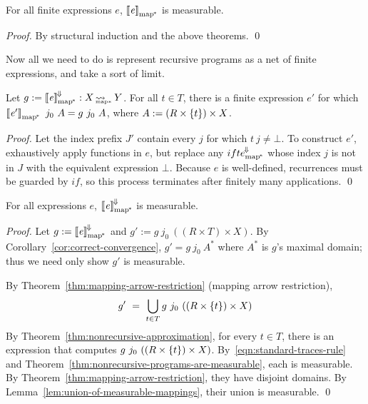 \documentclass{llncs}
\newcommand{\arrow}{\rightsquigarrow}
\newcommand{\conv}{^{\mspace{-2mu}\Downarrow\mspace{-2mu}}}
\newcommand{\meaningofconv}[1]{\left\llbracket{#1}\right\rrbracket\conv}
\newcommand{\arrowconvif}{\ensuremath{ifte\conv}}
\newcommand{\pmap}{_\mathrm{map^{\mspace{-2mu}*}}}
\DeclareMathOperator{\pmapto}{\arrow_{\mspace{-22mu}_{\mathrm{map*}}}}
\newcommand{\convifpmap}{\arrowconvif\pmap}
\begin{document}
\begin{theorem}
\label{thm:nonrecursive-programs-are-measurable}
For all finite expressions $\mathit{e}$, $\meaningof{\mathit{e}}\pmap$ is measurable.%
\end{theorem}
\begin{proof}
By structural induction and the above theorems.
\qed
\end{proof}

Now all we need to do is represent recursive programs as a net of finite expressions, and take a sort of limit.

\begin{theorem}
\label{thm:nonrecursive-approximation}
Let $g := \meaningofconv{\mathit{e}}\pmap : X \pmapto Y$.
For all $t \in T$, there is a finite expression $\mathit{e'}$ for which $\meaningof{\mathit{e'}}\pmap~j_0~A = g~j_0~A$, where $A := (R \times \{{t}\}) \times X$.%
\end{theorem}
\begin{proof}
Let the index prefix $J'$ contain every $j$ for which $t~j \neq \bot$.
To construct $\mathit{e'}$, exhaustively apply functions in $\mathit{e}$, but replace any $\convifpmap$ whose index $j$ is not in $J$ with the equivalent expression $\bot$.
Because $\mathit{e}$ is well-defined, recurrences must be guarded by $if$, so this process terminates after finitely many applications.
\qed
\end{proof}

\begin{theorem}
\label{thm:everything-is-measurable}
For all expressions $\mathit{e}$, $\meaningofconv{\mathit{e}}\pmap$ is measurable.%
\end{theorem}
\begin{proof}
Let $g := \meaningofconv{\mathit{e}}\pmap$ and $g' := g~j_0~((R \times T) \times X)$.
By Corollary~\ref{cor:correct-convergence}, $g' = g~j_0~A^*$ where $A^*$ is $g$'s maximal domain; thus we need only show $g'$ is measurable.

By Theorem~\ref{thm:mapping-arrow-restriction} (mapping arrow restriction),
\begin{equation}
	g' \ =\ \bigcup\limits_{t \in T} g~j_0~((R \times \set{t}) \times X)
\end{equation}
By Theorem~\ref{thm:nonrecursive-approximation}, for every $t \in T$, there is an expression that computes $g~j_0~((R \times \{{t}\}) \times X)$.
By~\eqref{eqn:standard-traces-rule} and Theorem~\ref{thm:nonrecursive-programs-are-measurable}, each is measurable.
By Theorem~\ref{thm:mapping-arrow-restriction}, they have disjoint domains.
By Lemma~\ref{lem:union-of-measurable-mappings}, their union is measurable.
\qed
\end{proof}
\end{document}
